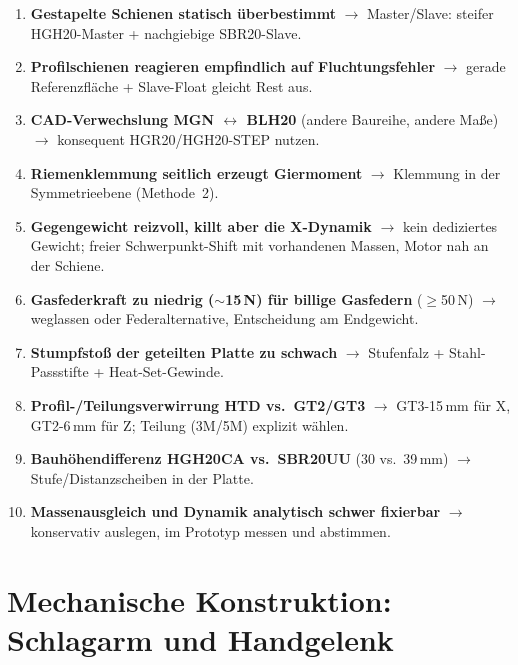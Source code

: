 \begin{enumerate}
  \item \textbf{Gestapelte Schienen statisch \"uberbestimmt} $\rightarrow$
        Master/Slave: steifer HGH20-Master + nachgiebige SBR20-Slave.
  \item \textbf{Profilschienen reagieren empfindlich auf Fluchtungsfehler}
        $\rightarrow$ gerade Referenzfl\"ache + Slave-Float gleicht Rest aus.
  \item \textbf{CAD-Verwechslung MGN $\leftrightarrow$ BLH20} (andere Baureihe,
        andere Ma\ss e) $\rightarrow$ konsequent HGR20/HGH20-STEP nutzen.
  \item \textbf{Riemenklemmung seitlich erzeugt Giermoment} $\rightarrow$
        Klemmung in der Symmetrieebene (Methode~2).
  \item \textbf{Gegengewicht reizvoll, killt aber die X-Dynamik} $\rightarrow$
        kein dediziertes Gewicht; freier Schwerpunkt-Shift mit vorhandenen
        Massen, Motor nah an der Schiene.
  \item \textbf{Gasfederkraft zu niedrig ($\sim$15\,N) f\"ur billige Gasfedern}
        ($\ge$50\,N) $\rightarrow$ weglassen oder Federalternative, Entscheidung
        am Endgewicht.
  \item \textbf{Stumpfsto\ss{} der geteilten Platte zu schwach} $\rightarrow$
        Stufenfalz + Stahl-Passstifte + Heat-Set-Gewinde.
  \item \textbf{Profil-/Teilungsverwirrung HTD vs.\ GT2/GT3} $\rightarrow$
        GT3-15\,mm f\"ur X, GT2-6\,mm f\"ur Z; Teilung (3M/5M) explizit w\"ahlen.
  \item \textbf{Bauh\"ohendifferenz HGH20CA vs.\ SBR20UU} (30 vs.\ 39\,mm)
        $\rightarrow$ Stufe/Distanzscheiben in der Platte.
  \item \textbf{Massenausgleich und Dynamik analytisch schwer fixierbar}
        $\rightarrow$ konservativ auslegen, im Prototyp messen und abstimmen.
\end{enumerate}

\section{Mechanische Konstruktion: Schlagarm und Handgelenk}
\label{sec:ttr-arm}

